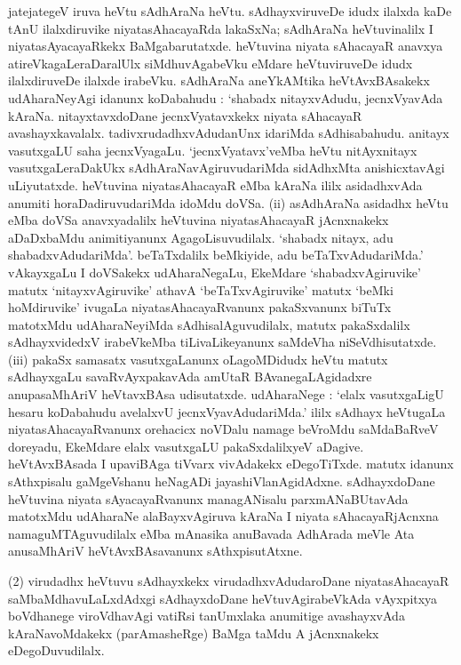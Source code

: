 jatejategeV iruva heVtu sAdhAraNa heVtu. sAdhayxviruveDe idudx ilalxda kaDe tAnU ilalxdiruvike niyatasAhacayaRda lakaSxNa; sAdhAraNa heVtuvinalilx I niyatasAyacayaRkekx BaMgabarutatxde. heVtuvina niyata sAhacayaR anavxya atireVka\-gaLeraDaralUlx siMdhuvAgabeVku eMdare heVtuviruveDe idudx ilalxdiruveDe ilalxde irabeVku. sAdhA\-raNa aneYkAMtika heVtAvxBAsakekx udAharaNeyAgi idanunx koDabahudu : `shabadx nitayxvAdudu, jecnxVyavAda kAraNa. nitayxtavxdoDane jecnxVyatavxkekx niyata sAhacayaR avashayxka\-valalx. tadivxrudadhxvAdudanUnx idariMda sAdhisabahudu. anitayx vasutxgaLU saha jecnxVya\-gaLu. `jecnxVyatavx'veMba heVtu nitAyxnitayx vasutxgaLeraDakUkx sAdhAraNavAgiruvudariMda sidAdhxMta anishicxtavAgi uLiyutatxde. heVtuvina niyatasAhacayaR eMba kAraNa ililx asidadhxvAda anumiti horaDadiruvudariMda idoMdu doVSa. {\rm(ii)} asAdhAraNa asidadhx heVtu eMba doVSa anavxyadalilx heVtuvina niyatasAhacayaR jAcnxnakekx aDaDxbaMdu animitiyanunx AgagoLisuvudilalx. `shabadx nitayx, adu shabadxvAdudariMda'. beTaTxdalilx beMkiyide, adu beTaTxvAdudariMda.' vAkayxgaLu I doVSakekx udAharaNegaLu, EkeMdare `shabadxvAgiruvike' matutx `nitayxvAgiruvike' athavA `beTaTxvAgiruvike' matutx `beMki hoMdiruvike' ivugaLa niyatasAhacayaRvanunx pakaSxvanunx biTuTx matotxMdu udAharaNeyiMda sAdhisalAguvudilalx, matutx pakaSxdalilx sAdhayxvidedxV irabeVkeMba tiLivaLikeyanunx saMdeVha niSeVdhisutatxde. {\rm(iii)} pakaSx samasatx vasutxgaLanunx oLagoMDidudx heVtu matutx sAdhayxgaLu savaRvAyxpakavAda amUtaR BAvanegaLAgidadxre anupasaMhAriV heVtavxBAsa udisutatxde. udAharaNege : `elalx vasutxgaLigU hesaru koDabahudu avelalxvU jecnxVyavAdudariMda.' ililx sAdhayx heVtugaLa niyatasAhacayaRvanunx orehacicx noVDalu namage beVroMdu saMdaBaRveV doreyadu, EkeMdare elalx vasutxgaLU pakaSxdalilxyeV aDagive. heVtAvxBAsada I upaviBAga tiVvarx vivAdakekx eDegoTiTxde. matutx idanunx sAthxpisalu gaMgeVshanu heNagADi jayashiVlanAgidAdxne. sAdhayxdoDane heVtuvina niyata sAyacayaRvanunx managANisalu parxmANaBUtavAda matotxMdu udAharaNe alaBayxvAgiruva kAraNa I niyata sAhacayaRjAcnxna namaguMTAguvudilalx eMba mAnasika anuBavada AdhArada meVle Ata anusaMhAriV heVtAvxBAsavanunx sAthxpisutAtxne.

(2) virudadhx heVtuvu sAdhayxkekx virudadhxvAdudaroDane niyatasAhacayaR saMbaMdha\-vuLaLxdAdxgi sAdhayxdoDane heVtuvAgirabeVkAda vAyxpitxya boVdhanege viroVdhavAgi vatiRsi tanUmxlaka anumitige avashayxvAda kAraNavoMdakekx (parAmasheRge) BaMga taMdu A jAcnxnakekx eDegoDuvudilalx.

